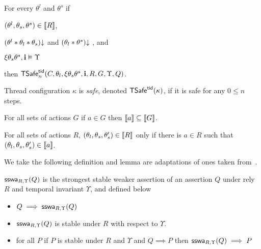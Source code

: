 \begin{defin}
\begin{compactenum}[(a)]
    \item \label{safe:env}
    For every $\theta^l$ and $\theta^s$ 
    if 
    \begin{compactenum}[(1)]
      \item \label{safe:env:rely} $(\theta^l,\theta_s,\theta^s)\in \db{R}$,
      \item \label{safe:env:consistent} $\consistent{\theta^l*\theta_l*\theta_s}$ 
      and $\consistent{\theta_l*\theta^s}$ , and
      \item \label{safe:env:inv} $\xi\theta_s\theta^s,\intp\vDash\Upsilon$
    \end{compactenum}
    then $\safe_{n}(C,\theta_l,\xi\theta_s\theta^s,\intp,R,G,\Upsilon,Q)$.
  \end{compactenum}
  Thread configuration $\kappa$ is \emph{safe}, denoted $\safe(\kappa)$, if it is safe for any $0 \leq n$ steps.
\end{defin}

\begin{proposition}
For all sets of actions $G$ if $a \in G$ then $\db{a} \subseteq \db{G}$.
\end{proposition}

\begin{proposition}
For all sets of actions $R$,  $(\theta_l,\theta_s,\theta_s') \in \db{R}$
only if there is $a \in R$ such that   $(\theta_l,\theta_s,\theta_s') \in \db{a}$.
\end{proposition}



We take the following definition and lemma are adaptations of ones taken from~\cite{rgsep}. 

\begin{defin}\label{def:sswa}
$\sswa{Q}{R}{\Upsilon}$ is the strongest stable weaker assertion of an assertion $Q$ under rely $R$ and temporal invariant $\Upsilon$, and defined below
\begin{itemize}
\item \label{def:sswa:imp}
$Q \implies \sswa{Q}{R}{\Upsilon}$
\item $\sswa{Q}{R}{\Upsilon}$ is stable under $R$ with respect to $\Upsilon$. 
\item for all $P$ if $P$ is stable under $R$ and $\Upsilon$ and $Q \implies P$ then $\sswa{Q}{R}{\Upsilon} \implies P$
\end{itemize}
\end{defin}

